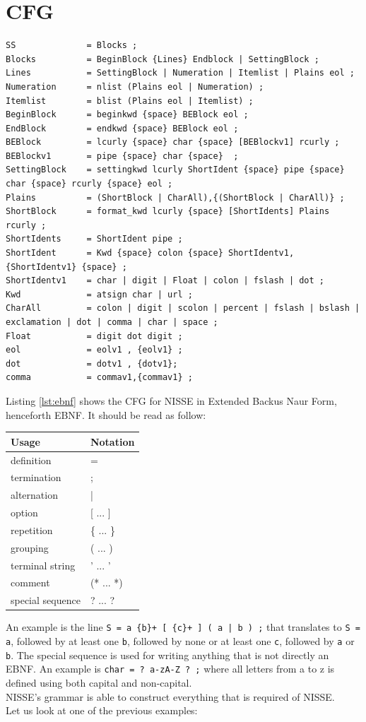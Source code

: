 \section{CFG}
\begin{lstlisting}[frame=single, caption={CFG of NISSE in EBNF.}, label={lst:ebnf}, language=NISSE]
SS              = Blocks ;
Blocks          = BeginBlock {Lines} Endblock | SettingBlock ;
Lines           = SettingBlock | Numeration | Itemlist | Plains eol ;
Numeration      = nlist (Plains eol | Numeration) ;
Itemlist        = blist (Plains eol | Itemlist) ;
BeginBlock      = beginkwd {space} BEBlock eol ;
EndBlock        = endkwd {space} BEBlock eol ;
BEBlock         = lcurly {space} char {space} [BEBlockv1] rcurly ;
BEBlockv1       = pipe {space} char {space}  ;
SettingBlock    = settingkwd lcurly ShortIdent {space} pipe {space} char {space} rcurly {space} eol ;
Plains          = (ShortBlock | CharAll),{(ShortBlock | CharAll)} ;
ShortBlock      = format_kwd lcurly {space} [ShortIdents] Plains rcurly ;
ShortIdents     = ShortIdent pipe ;
ShortIdent      = Kwd {space} colon {space} ShortIdentv1,{ShortIdentv1} {space} ;
ShortIdentv1    = char | digit | Float | colon | fslash | dot ;
Kwd             = atsign char | url ;
CharAll         = colon | digit | scolon | percent | fslash | bslash | exclamation | dot | comma | char | space ;
Float           = digit dot digit ; 
eol             = eolv1 , {eolv1} ;
dot             = dotv1 , {dotv1};
comma           = commav1,{commav1} ;
\end{lstlisting}
Listing \ref{lst:ebnf} shows the CFG for NISSE in Extended Backus Naur Form, henceforth EBNF. It should be read as follow:
\begin{center}
\begin{tabular}{|l|l|}
\hline 
Usage & Notation \\ 
\hline 
definition & = \\ 
\hline 
termination & ; \\ 
\hline 
alternation & | \\ 
\hline 
option & [ ... ] \\ 
\hline 
repetition & \{ ... \} \\ 
\hline 
grouping & ( ... ) \\ 
\hline 
terminal string & ' ... ' \\ 
\hline 
comment & (* ... *) \\ 
\hline 
special sequence & ? ... ? \\ 
\hline 
\end{tabular}
\end{center}
An example is the line \lstinline!S = a {b}+ [ {c}+ ] ( a | b ) ;! that translates to \lstinline!S = a!, followed by at least one \lstinline!b!, followed by none or at least one \lstinline!c!, followed by \lstinline!a! or \lstinline!b!. The special sequence is used for writing anything that is not directly an EBNF. An example is \lstinline!char = ? a-zA-Z ? ;! where all letters from a to z is defined using both capital and non-capital. \\
NISSE's grammar is able to construct everything that is required of NISSE. \\
Let us look at one of the previous examples:

